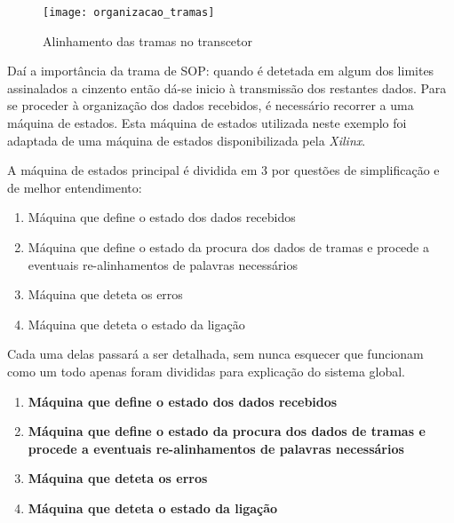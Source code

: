 \begin{figure}[h!]
		\begin{center}
		\leavevmode
		\texttt{[image: organizacao\_tramas]}
		\captionsetup{width=1.0\linewidth}
		\caption[Alinhamento das tramas no transcetor]{Alinhamento das tramas no transcetor}
		\label{fig:alinhamento_tramas_gtx}
	\end{center}
\end{figure}

Daí a importância da trama de SOP: quando é detetada em algum dos limites assinalados a cinzento então dá-se inicio à transmissão dos restantes dados. Para se proceder à organização dos dados recebidos, é necessário recorrer a uma máquina de estados. Esta máquina de estados utilizada neste exemplo foi adaptada de uma máquina de estados disponibilizada pela \textit{Xilinx}.

A máquina de estados principal é dividida em 3 por questões de simplificação e de melhor entendimento:
\begin{enumerate}
	\item Máquina que define o estado dos dados recebidos
	\item Máquina que define o estado da procura dos dados de tramas e procede a eventuais re-alinhamentos de palavras necessários
	\item Máquina que deteta os erros 
	\item Máquina que deteta o estado da ligação
\end{enumerate}

Cada uma delas passará a ser detalhada, sem nunca esquecer que funcionam como um todo apenas foram divididas para explicação do sistema global.

\begin{enumerate}
	\item \textbf{Máquina que define o estado dos dados recebidos}
	\item \textbf{Máquina que define o estado da procura dos dados de tramas e procede a eventuais re-alinhamentos de palavras necessários}
	\item \textbf{Máquina que deteta os erros }
	\item \textbf{Máquina que deteta o estado da ligação}
\end{enumerate}

  
